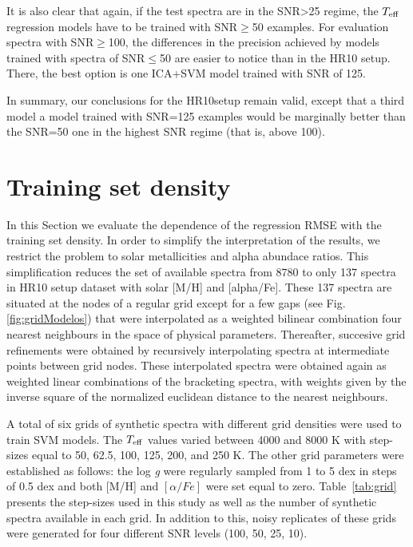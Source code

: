 \documentclass[a4paper,fleqn,usenatbib]{mnras}
\begin{document}
{{{It is also clear that again, if the test spectra 
are in the SNR>25 regime, the $T_{\rm eff}$ 
regression models have to be trained with SNR$\ge$50 examples.
For evaluation spectra with SNR$\ge$100, the differences 
in the precision achieved by models trained with spectra of 
SNR$\le$50 are easier to notice than in the HR10 setup. There, the best 
option is one ICA+SVM model trained with SNR of 125.

In summary, our conclusions for the HR10setup remain valid, except 
that a third model a model trained with SNR=125 examples would be marginally 
better than the SNR=50 one in the highest SNR regime (that is, above 100). 

\section{Training set density}
\label{sec:comparison3}

In this Section we evaluate the dependence of the regression 
RMSE with the training set density. In order to simplify the 
interpretation of the results, we restrict the problem to solar 
metallicities and alpha abundace ratios. This simplification 
reduces the set of available spectra from 8780 to only 137 
spectra in HR10 setup dataset with solar [M/H] and [alpha/Fe]. 
These 137 spectra are situated at the nodes of a regular 
grid except for a few gaps (see Fig. \ref{fig:gridModelos}) 
that were interpolated as a weighted bilinear combination four 
nearest neighbours in the space of physical parameters. Thereafter, 
succesive grid refinements were obtained by recursively interpolating 
spectra at intermediate points between grid nodes. These interpolated 
spectra were obtained again as weighted linear combinations of the 
bracketing spectra, with weights given by the inverse square of 
the normalized euclidean distance to the nearest neighbours.

A total of six grids of synthetic spectra with different grid densities were used to
train SVM models. The $T_{\rm eff}$ values varied between 4000 and
8000 K with step-sizes equal to 50, 62.5, 100, 125, 200, and 250 K. The other
grid parameters were established as follows: the log \textit{g} were
regularly sampled from 1 to 5 dex in steps of 0.5 dex and both [M/H] and $\left[
\alpha/Fe \right]$ were set equal to zero. Table~\ref{tab:grid} presents 
the step-sizes used in this study as well as the number of synthetic spectra available in each
grid.  In addition to this, noisy replicates of these grids were
generated for four different SNR levels (100, 50, 25, 10).


}}}
\end{document}
